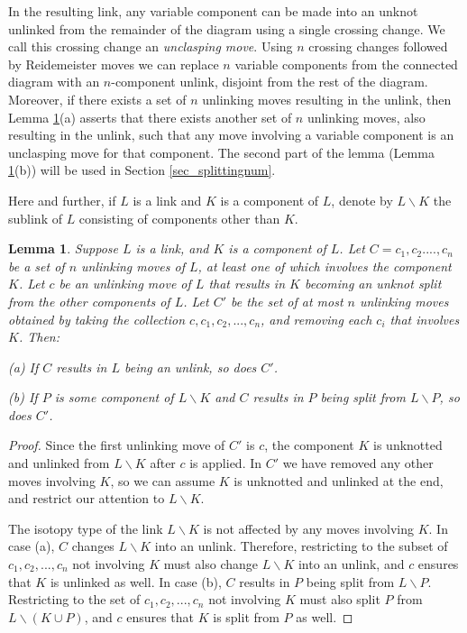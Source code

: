 \documentclass[12pt]{amsart}
\newtheorem{lemma}[thm]{Lemma}
\theoremstyle{definition}
\theoremstyle{remark}
\begin{document}
In the resulting link, any variable component can be made into an unknot unlinked from the remainder of the diagram using a single crossing change.  We call this crossing change an \emph{unclasping move}.  Using $n$ crossing changes followed by Reidemeister moves we can replace $n$ variable components from the connected diagram with an $n$-component unlink, disjoint from the rest of the diagram.  Moreover, if there exists a set of $n$ unlinking moves resulting in the unlink, then Lemma \ref{lem_unlinking}(a) asserts that there exists another set of $n$ unlinking moves, also resulting in the unlink, such that any move involving a variable component is an unclasping move for that component.  The second part of the lemma (Lemma \ref{lem_unlinking}(b)) will be used in Section \ref{sec_splittingnum}.

 Here and further, if $L$ is a link and $K$ is a component of $L$, denote by $L \backslash K$ the sublink of $L$ consisting of components other than $K$.







\begin{lemma}
\label{lem_unlinking}
Suppose $L$ is a link, and $K$ is a component of $L$.  Let $C=c_1, c_2. ..., c_n$ be a set of $n$ unlinking moves of $L$, at least one of which involves the component $K$. Let $c$ be an unlinking move of $L$ that results in $K$ becoming an unknot split from the other components of $L$. Let $C'$ be the set of at most $n$ unlinking moves obtained by taking the collection $c, c_1, c_2, ..., c_n$, and removing each $c_i$ that involves $K$.  Then:
\vspace{0.1in}

(a) If $C$ results in $L$ being an unlink, so does $C'$.
\vspace{0.1in}

(b) If $P$ is some component of $L \backslash K$ and $C$ results in $P$ being split from $L \backslash P$, so does $C'$.
\end{lemma}

\begin{proof}
Since the first unlinking move of $C'$ is $c$, the component $K$ is unknotted and unlinked from $L\backslash K$ after $c$ is applied. In $C'$ we have removed any other moves involving $K$, so we can assume $K$ is unknotted and unlinked at the end, and restrict our attention to $L \backslash K$.

The isotopy type of the link $L \backslash K$ is not affected by any moves involving $K$. In case (a), $C$ changes $L \backslash K$ into an unlink. Therefore, restricting to the subset of $c_1, c_2, ..., c_n$ not involving $K$ must also change $L \backslash K$ into an unlink, and $c$ ensures that $K$ is unlinked as well. In case (b), $C$ results in $P$ being split from $L \backslash P$.  Restricting to the set of $c_1, c_2, ..., c_n$ not involving $K$ must also split $P$ from $L \backslash (K \cup P)$, and $c$ ensures that $K$ is split from $P$ as well.
\end{proof}
\end{document}

